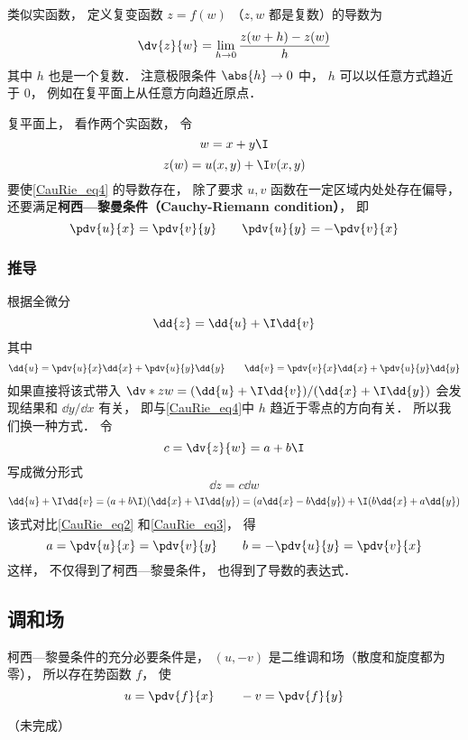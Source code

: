 

类似实函数， 定义复变函数 $z = f(w)$ （$z, w$ 都是复数）的导数为
\begin{equation}\label{CauRie_eq4}
\dv{z}{w} = \lim_{h\to 0} \frac{z(w + h) - z(w)}{h}
\end{equation}
其中 $h$ 也是一个复数． 注意极限条件 $\abs{h}\to 0$ 中， $h$ 可以以任意方式趋近于 $0$， 例如在复平面上从任意方向趋近原点．

复平面上， 看作两个实函数， 令
\begin{equation}
w = x + y\I
\end{equation}
\begin{equation}
z(w) = u(x, y) + \I v(x, y)
\end{equation}
要使\autoref{CauRie_eq4} 的导数存在， 除了要求 $u, v$ 函数在一定区域内处处存在偏导， 还要满足\textbf{柯西—黎曼条件（Cauchy-Riemann condition）}， 即
\begin{equation}\label{CauRie_eq1}
\pdv{u}{x} = \pdv{v}{y} \qquad
\pdv{u}{y} = - \pdv{v}{x}
\end{equation}

\subsubsection{推导}
根据全微分
\begin{equation}\label{CauRie_eq2}
\dd{z} = \dd{u} + \I \dd{v}
\end{equation}
其中
\begin{equation}\label{CauRie_eq3}
\dd{u} = \pdv{u}{x} \dd{x} + \pdv{u}{y} \dd{y} \qquad
\dd{v} = \pdv{v}{x} \dd{x} + \pdv{u}{y} \dd{y}
\end{equation}
如果直接将该式带入 $\dv*{z}{w} = (\dd{u} + \I \dd{v})/(\dd{x} + \I \dd{y})$ 会发现结果和 $\dd{y}/\dd{x}$ 有关， 即与\autoref{CauRie_eq4}中 $h$ 趋近于零点的方向有关． 所以我们换一种方式． 令
\begin{equation}
c = \dv{z}{w} = a + b\I
\end{equation}
写成微分形式
\begin{equation}
\dd{z} = c\dd{w}
\end{equation}
\begin{equation}
\dd{u} + \I \dd{v} = (a + b\I)(\dd{x} + \I\dd{y}) = (a \dd{x} - b\dd{y}) + \I (b \dd{x} + a\dd{y})
\end{equation}
该式对比\autoref{CauRie_eq2} 和\autoref{CauRie_eq3}， 得
\begin{equation}
a = \pdv{u}{x} = \pdv{v}{y} \qquad
b = -\pdv{u}{y} = \pdv{v}{x}
\end{equation}
这样， 不仅得到了柯西—黎曼条件， 也得到了导数的表达式．


\subsection{调和场}

柯西—黎曼条件的充分必要条件是， $(u, -v)$ 是二维调和场（散度和旋度都为零）， 所以存在势函数 $f$， 使
\begin{equation}
u = \pdv{f}{x} \qquad -v = \pdv{f}{y}
\end{equation}

（未完成）

